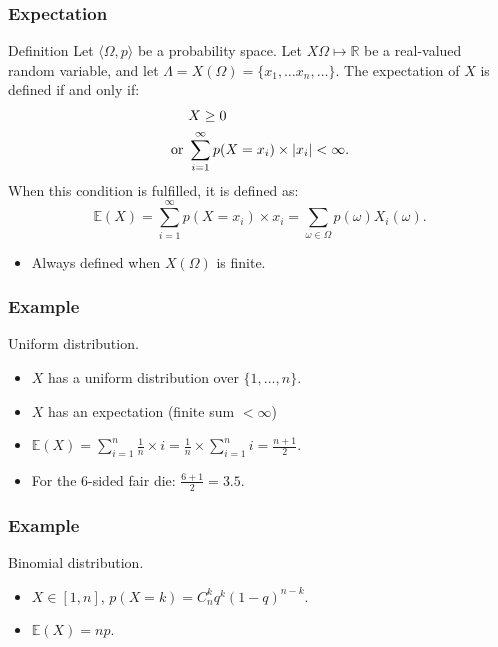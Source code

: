 \documentclass{beamer}
\begin{document}
\begin{frame}
  \frametitle{Expectation}
  \begin{block}{Definition}
    Let $\langle \Omega, p \rangle$ be a probability space. Let $X \Omega \mapsto \mathbb{R}$ be a real-valued random variable, and let $\Lambda = X(\Omega) = \{x_1, \dots x_n, \dots\}$. The expectation of $X$ is defined if and only if:
    \[\begin{aligned} &X \ge 0\\\textnormal{or }&\sum^{\infty}_{i=1} p(X = x_i) \times |x_i| < \infty.\end{aligned}\]
    When this condition is fulfilled, it is defined as:
    \[\mathbb{E}(X) = \sum^{\infty}_{i=1} p(X = x_i) \times x_i = \sum_{\omega \in \Omega} p(\omega) X_i(\omega) .\]
  \end{block}
  \begin{itemize}
  \item \alert{Always defined when $X(\Omega)$ is finite.}
  \end{itemize}
\end{frame}

\begin{frame}
  \frametitle{Example}
  \begin{exampleblock}{Uniform distribution.}
    \begin{itemize}
    \item $X$ has a uniform distribution over $\{1, \dots, n\}$.
    \item $X$ has an expectation (finite sum $< \infty$)
    \item $\mathbb{E}(X) = \sum^n_{i=1} \frac{1}{n} \times i = \frac{1}{n} \times \sum^n_{i = 1} i = \frac{n+1}{2}$.     
    \item For the $6$-sided fair die: $\frac{6+1}{2} = 3.5$.
    \end{itemize}
  \end{exampleblock}
\end{frame}

\begin{frame}
  \frametitle{Example}
  \begin{exampleblock}{Binomial distribution.}
    \begin{itemize}
    \item $X \in [1,n]$, $p(X = k) = C^k_n q^k(1-q)^{n-k}$.
    \item $\mathbb{E}(X) = np$.
    \end{itemize}
  \end{exampleblock}
\end{frame}
\end{document}
